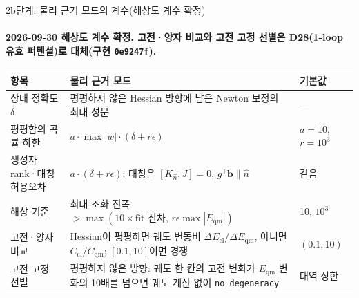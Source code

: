 \begin{frame}[label=stage2b-coefficients]{2b단계: 물리 근거 모드의 계수(해상도 계수 확정)}
    \framesubtitle{2026-09-30 해상도 계수 확정. 고전·양자 비교와 고전 고정 선별은 D28(1-loop 유효 퍼텐셜)로 대체(구현 \texttt{0e9247f}).}
  \small\renewcommand{\arraystretch}{1.1}
  \begin{tabularx}{\textwidth}{@{}P{2.6cm}YP{1.6cm}@{}}
    \toprule
    항목 & 물리 근거 모드 & 기본값 \\
    \midrule
    상태 정확도 $\delta$ & 평평하지 않은 Hessian 방향에 남은 Newton 보정의 최대 성분 & --- \\
    평평함의 곡률 하한 & $a\cdot\max|w|\cdot(\delta+r\epsilon)$ & $a=10$, $r=10^3$ \\
    생성자 rank·대칭 허용오차 & $a\cdot(\delta+r\epsilon)$; 대칭은 $[K_{\hat n},J]=0$, $g^{\mathsf T}\mathbf b\parallel\hat n$ & 같음 \\
    해상 기준 & 최대 조화 진폭 $>\max(10\times\text{fit 잔차},\,r\epsilon\max|E_{\mathrm{qm}}|)$ & 10, $10^3$ \\
    고전·양자 비교 & Hessian이 평평하면 궤도 변동비 $\Delta E_{\mathrm{cl}}/\Delta E_{\mathrm{qm}}$, 아니면 $C_{\mathrm{cl}}/C_{\mathrm{qm}}$; $[0.1,10]$이면 경쟁 & $(0.1,10)$ \\
    고전 고정 선별 & 평평하지 않은 방향: 궤도 한 칸의 고전 변화가 $E_{\mathrm{qm}}$ 변화의 10배를 넘으면 궤도 계산 없이 \texttt{no\_degeneracy} & 대역 상한 \\
    \bottomrule
  \end{tabularx}
  \par\medskip
\end{frame}

